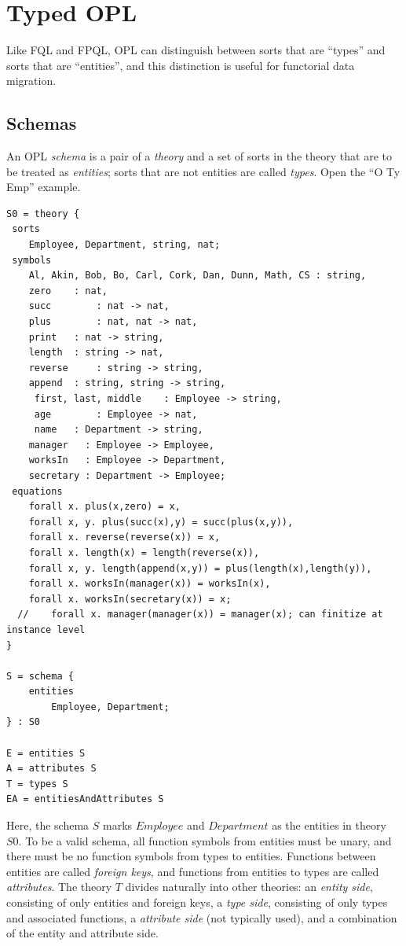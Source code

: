 \documentclass[12pt]{article}
\begin{document}
\section{Typed OPL}

Like FQL and FPQL, OPL can distinguish between sorts that are ``types'' and sorts that are ``entities'', and this distinction is useful for functorial data migration.

\subsection{Schemas}

An OPL {\it schema} is a pair of a {\it theory} and a set of sorts in the theory that are to be treated as {\it entities}; sorts that are not entities are called {\it types}.  Open the ``O Ty Emp'' example.
\begin{verbatim}
S0 = theory { 
 sorts
 	Employee, Department, string, nat;
 symbols
 	Al, Akin, Bob, Bo, Carl, Cork, Dan, Dunn, Math, CS : string,
 	zero 	: nat,
 	succ		: nat -> nat,
 	plus		: nat, nat -> nat,
 	print	: nat -> string,
 	length 	: string -> nat,
 	reverse 	: string -> string,
 	append	: string, string -> string,
     first, last, middle 	: Employee -> string,
     age		: Employee -> nat,
     name 	: Department -> string,
	manager   : Employee -> Employee,
	worksIn   : Employee -> Department,
	secretary : Department -> Employee;
 equations  
 	forall x. plus(x,zero) = x,
 	forall x, y. plus(succ(x),y) = succ(plus(x,y)),
 	forall x. reverse(reverse(x)) = x,
 	forall x. length(x) = length(reverse(x)),
 	forall x, y. length(append(x,y)) = plus(length(x),length(y)),
  	forall x. worksIn(manager(x)) = worksIn(x),
  	forall x. worksIn(secretary(x)) = x;
  //	forall x. manager(manager(x)) = manager(x); can finitize at instance level 
}

S = schema {
	entities
		Employee, Department;	
} : S0

E = entities S
A = attributes S
T = types S
EA = entitiesAndAttributes S
\end{verbatim}

Here, the schema $S$ marks $Employee$ and $Department$ as the entities in theory $S0$.  To be a valid schema, all function symbols from entities must be unary, and there must be no function symbols from types to entities.  Functions between entities are called {\it foreign keys}, and functions from entities to types are called {\it attributes}.  The theory $T$ divides naturally into other theories: an {\it entity side}, consisting of only entities and foreign keys, a {\it type side}, consisting of only types and associated functions, a {\it attribute side} (not typically used), and a combination of the entity and attribute side.   
\end{document}
